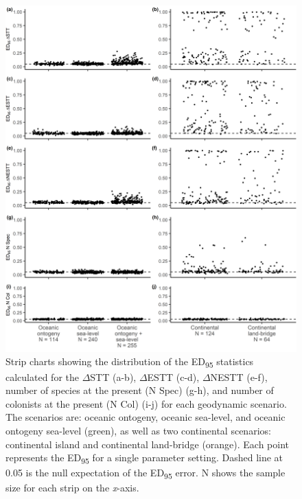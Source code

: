 \begin{figure}
    \centering
    \includegraphics[width=\textwidth]{facet_scenario_di.png}
    \caption{Strip charts showing the distribution of the ED\textsubscript{95} statistics calculated for the $\Delta$STT (a-b), $\Delta$ESTT (c-d), $\Delta$NESTT (e-f), number of species at the present (N Spec) (g-h), and number of colonists at the present (N Col) (i-j) for each geodynamic scenario. The scenarios are: oceanic ontogeny, oceanic sea-level, and oceanic ontogeny sea-level (green), as well as two continental scenarios: continental island and continental land-bridge (orange). Each point represents the ED\textsubscript{95} for a single parameter setting. Dashed line at 0.05 is the null expectation of the ED\textsubscript{95} error. N shows the sample size for each strip on the \textit{x}-axis.}
    \label{fig:facet_scenario_di}
\end{figure}

